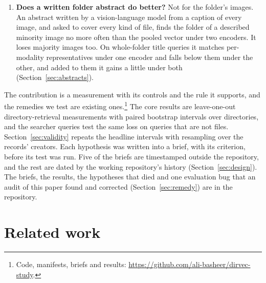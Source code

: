 \documentclass[11pt]{article}
\begin{document}
\begin{enumerate}
\item \textbf{Does a written folder abstract do better?} Not for the folder's images. An abstract written by a vision-language model from a caption of every image, and asked to cover every kind of file, finds the folder of a described minority image no more often than the pooled vector under two encoders. It loses majority images too. On whole-folder title queries it matches per-modality representatives under one encoder and falls below them under the other, and added to them it gains a little under both (Section~\ref{sec:abstracts}).
\end{enumerate}

The contribution is a measurement with its controls and the rule it supports, and the remedies we test are existing ones.\footnote{Code, manifests, briefs and results: \url{https://github.com/ali-basheer/dirvec-study}.} The core results are leave-one-out directory-retrieval measurements with paired bootstrap intervals over directories, and the searcher queries test the same loss on queries that are not files. Section~\ref{sec:validity} repeats the headline intervals with resampling over the records' creators. Each hypothesis was written into a brief, with its criterion, before its test was run. Five of the briefs are timestamped outside the repository, and the rest are dated by the working repository's history (Section~\ref{sec:design}). The briefs, the results, the hypotheses that died and one evaluation bug that an audit of this paper found and corrected (Section~\ref{sec:remedy}) are in the repository.

\section{Related work}
\label{sec:related}
\end{document}

